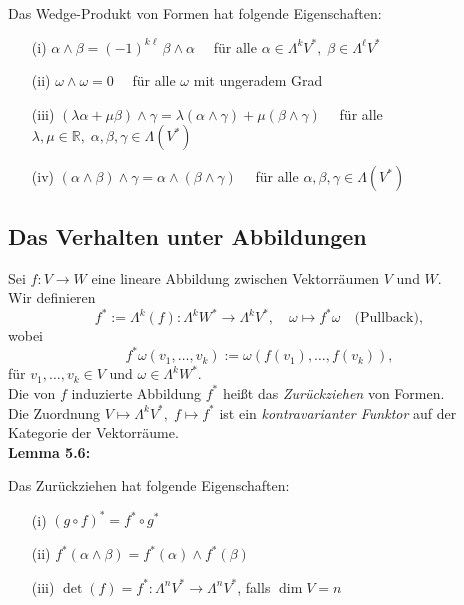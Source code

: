 \documentclass[fleqn, 12pt, letterpaper]{article}
\begin{document}
Das Wedge-Produkt von Formen hat folgende Eigenschaften:

\begin{itemize}
  \item[(i)] \( \alpha \wedge \beta = (-1)^{k \ell} \, \beta \wedge \alpha \quad \)
  für alle \( \alpha \in \Lambda^k V^*, \; \beta \in \Lambda^\ell V^* \)
  
  \item[(ii)] \( \omega \wedge \omega = 0 \quad \)
  für alle \( \omega \) mit ungeradem Grad
  
  \item[(iii)] \( (\lambda \alpha + \mu \beta) \wedge \gamma = \lambda (\alpha \wedge \gamma) + \mu (\beta \wedge \gamma) \quad \)
  für alle \( \lambda, \mu \in \mathbb{R}, \; \alpha, \beta, \gamma \in \Lambda( V^*) \)
  
  \item[(iv)] \( (\alpha \wedge \beta) \wedge \gamma = \alpha \wedge (\beta \wedge \gamma) \quad \)
  für alle \( \alpha, \beta, \gamma \in \Lambda( V^*) \)
\end{itemize}

\subsection{Das Verhalten unter Abbildungen}

Sei \( f \colon V \to W \) eine lineare Abbildung zwischen Vektorräumen \( V \) und \( W \).\\
Wir definieren
\[
f^* := \Lambda^k(f) \colon \Lambda^k W^* \longrightarrow \Lambda^k V^*, \quad
\omega \mapsto f^* \omega \quad (\text{Pullback)},
\]
wobei
\[
f^* \omega(v_1, \dots, v_k) := \omega(f(v_1), \dots, f(v_k)),
\]
für \( v_1, \dots, v_k \in V \) und \( \omega \in \Lambda^k W^* \).\\

Die von \( f \) induzierte Abbildung \( f^* \) heißt das \emph{Zurückziehen} von Formen.\\

Die Zuordnung \( V \mapsto \Lambda^k V^*, \; f \mapsto f^* \) ist ein \emph{kontravarianter Funktor} auf der Kategorie der Vektorräume.\\

\textbf{Lemma 5.6:}

Das Zurückziehen hat folgende Eigenschaften:
\begin{itemize}
  \item[(i)] \( (g \circ f)^* = f^* \circ g^* \)
  \item[(ii)] \( f^*(\alpha \wedge \beta) = f^*(\alpha) \wedge f^*(\beta) \)
  \item[(iii)] \( \det(f) = f^*:\Lambda^nV^* \rightarrow \Lambda^nV^* \), falls \( \dim V = n \)
\end{itemize}
\end{document}
